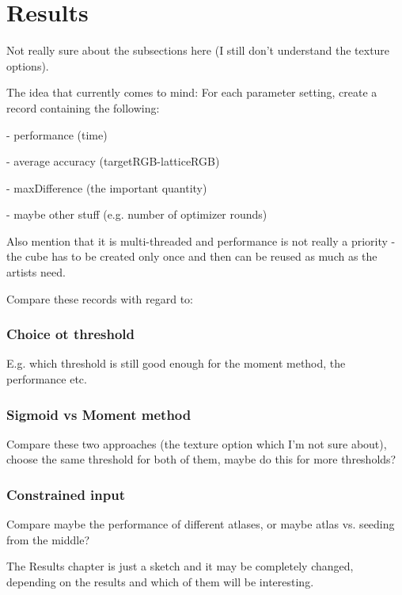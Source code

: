 \chapter{Results}

Not really sure about the subsections here (I still don't understand the texture options).

The idea that currently comes to mind: For each parameter setting, create a record containing the following: 

- performance (time)

- average accuracy (targetRGB-latticeRGB)

- maxDifference (the important quantity)

- maybe other stuff (e.g. number of optimizer rounds)

Also mention that it is multi-threaded and performance is not really a priority - the cube has to be created only once and then can be reused as much as the artists need.

Compare these records with regard to:

\subsection{Choice ot threshold}

E.g. which threshold is still good enough for the moment method, the performance etc.

\subsection{Sigmoid vs Moment method}

Compare these two approaches (the texture option which I'm not sure about), choose the same threshold for both of them, maybe do this for more thresholds?

\subsection{Constrained input}

Compare maybe the performance of different atlases, or maybe atlas vs. seeding from the middle?

The Results chapter is just a sketch and it may be completely changed, depending on the results and which of them will be interesting.

